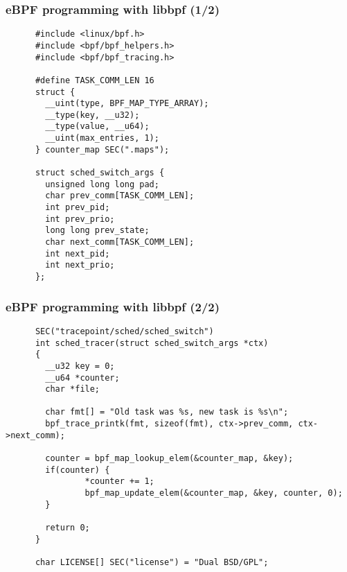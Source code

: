 \begin{frame}[fragile]
  \frametitle{eBPF programming with libbpf (1/2)}
  \begin{block}{}
    \begin{verbatim}
      #include <linux/bpf.h>
      #include <bpf/bpf_helpers.h>
      #include <bpf/bpf_tracing.h>

      #define TASK_COMM_LEN 16
      struct {
        __uint(type, BPF_MAP_TYPE_ARRAY);
        __type(key, __u32);
        __type(value, __u64);
        __uint(max_entries, 1);
      } counter_map SEC(".maps");

      struct sched_switch_args {
        unsigned long long pad;
        char prev_comm[TASK_COMM_LEN];
        int prev_pid;
        int prev_prio;
        long long prev_state;
        char next_comm[TASK_COMM_LEN];
        int next_pid;
        int next_prio;
      };
    \end{verbatim}
  \end{block}
\end{frame}

\begin{frame}[fragile]
  \frametitle{eBPF programming with libbpf (2/2)}
  \begin{block}{}
    \begin{verbatim}
      SEC("tracepoint/sched/sched_switch")
      int sched_tracer(struct sched_switch_args *ctx)
      {
        __u32 key = 0;
        __u64 *counter;
        char *file;

        char fmt[] = "Old task was %s, new task is %s\n";
        bpf_trace_printk(fmt, sizeof(fmt), ctx->prev_comm, ctx->next_comm);

        counter = bpf_map_lookup_elem(&counter_map, &key);
        if(counter) {
                *counter += 1;
                bpf_map_update_elem(&counter_map, &key, counter, 0);
        }

        return 0;
      }

      char LICENSE[] SEC("license") = "Dual BSD/GPL";
    \end{verbatim}
  \end{block}
\end{frame}


